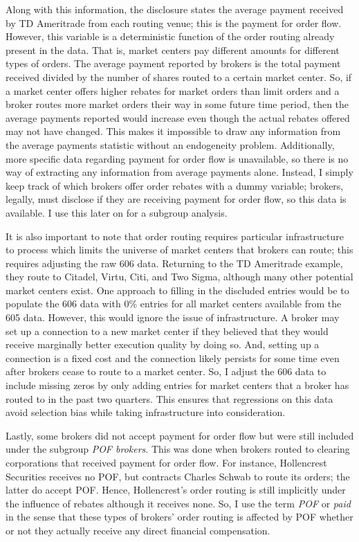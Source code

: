 \documentclass[12pt,a4paper]{article}
\begin{document}
		Along with this information, the disclosure states the average payment received by TD Ameritrade from each routing venue; this is the payment for order flow. However, this variable is a deterministic function of the order routing already present in the data. That is, market centers pay different amounts for different types of orders. The average payment reported by brokers is the total payment received divided by the number of shares routed to a certain market center. So, if a market center offers higher rebates for market orders than limit orders and a broker routes more market orders their way in some future time period, then the average payments reported would increase even though the actual rebates offered may not have changed. This makes it impossible to draw any information from the average payments statistic without an endogeneity problem. Additionally, more specific data regarding payment for order flow is unavailable, so there is no way of extracting any information from average payments alone. Instead, I simply keep track of which brokers offer order rebates with a dummy variable; brokers, legally, must disclose if they are receiving payment for order flow, so this data is available. I use this later on for a subgroup analysis. 
		
		It is also important to note that order routing requires particular infrastructure to process which limits the universe of market centers that brokers can route; this requires adjusting the raw 606 data. Returning to the TD Ameritrade example, they route to Citadel, Virtu, Citi, and Two Sigma, although many other potential market centers exist. One approach to filling in the discluded entries would be to populate the 606 data with 0\% entries for all market centers available from the 605 data. However, this would ignore the issue of infrastructure. A broker may set up a connection to a new market center if they believed that they would receive marginally better execution quality by doing so. And, setting up a connection is a fixed cost and the connection likely persists for some time even after brokers cease to route to a market center. So, I adjust the 606 data to include missing zeros by only adding entries for market centers that a broker has routed to in the past two quarters. This ensures that regressions on this data avoid selection bias while taking infrastructure into consideration. 
		
		Lastly, some brokers did not accept payment for order flow but were still included under the subgroup \textit{POF brokers}. This was done when brokers routed to clearing corporations that received payment for order flow. For instance, Hollencrest Securities receives no POF, but contracts Charles Schwab to route its orders; the latter do accept POF. Hence, Hollencrest's order routing is still implicitly under the influence of rebates although it receives none. So, I use the term \textit{POF} or \textit{paid} in the sense that these types of brokers' order routing is affected by POF whether or not they actually receive any direct financial compensation.
		
\end{document}
